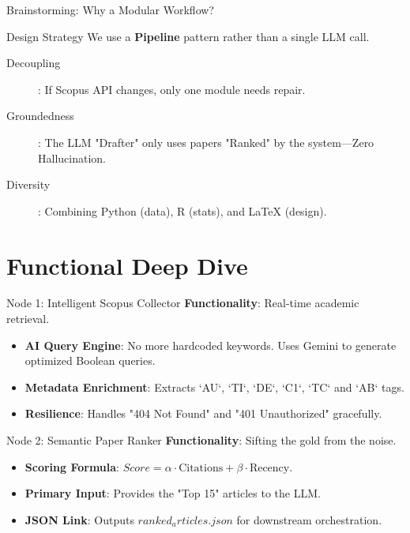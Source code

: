 \documentclass[10pt]{beamer}
\begin{document}
\begin{frame}{Brainstorming: Why a Modular Workflow?}
    \begin{alertblock}{Design Strategy}
        We use a \textbf{Pipeline} pattern rather than a single LLM call.
    \end{alertblock}
    \vfill
    \begin{description}
        \item[Decoupling]: If Scopus API changes, only one module needs repair.
        \item[Groundedness]: The LLM "Drafter" only uses papers "Ranked" by the system—Zero Hallucination.
        \item[Diversity]: Combining Python (data), R (stats), and LaTeX (design).
    \end{description}
\end{frame}

\section{Functional Deep Dive}
\begin{frame}{Node 1: Intelligent Scopus Collector}
    \textbf{Functionality}: Real-time academic retrieval.
    \vfill
    \begin{itemize}
        \item \textbf{AI Query Engine}: No more hardcoded keywords. Uses Gemini to generate optimized Boolean queries.
        \item \textbf{Metadata Enrichment}: Extracts `AU`, `TI`, `DE`, `C1`, `TC` and `AB` tags.
        \item \textbf{Resilience}: Handles "404 Not Found" and "401 Unauthorized" gracefully.
    \end{itemize}
\end{frame}

\begin{frame}{Node 2: Semantic Paper Ranker}
    \textbf{Functionality}: Sifting the gold from the noise.
    \vfill
    \begin{itemize}
        \item \textbf{Scoring Formula}: $Score = \alpha \cdot \text{Citations} + \beta \cdot \text{Recency}$.
        \item \textbf{Primary Input}: Provides the "Top 15" articles to the LLM.
        \item \textbf{JSON Link}: Outputs $ranked_articles.json$  for downstream orchestration.
    \end{itemize}
\end{frame}
\end{document}

